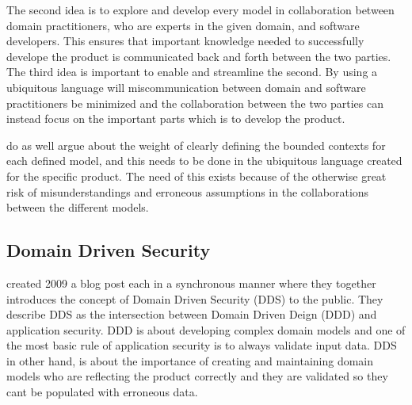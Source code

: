 The second idea is to explore and develop every model in collaboration between domain practitioners, who are experts in the given domain, and software developers. This ensures that important knowledge needed to successfully develope the product is communicated back and forth between the two parties. \parencite{millett_2015} The third idea is important to enable and streamline the second. By using a ubiquitous language will miscommunication between domain and software practitioners be minimized and the collaboration between the two parties can instead focus on the important parts which is to develop the product. \parencite{evans_2015}

\textcite{evans_2015} do as well argue about the weight of clearly defining the bounded contexts for each defined model, and this needs to be done in the ubiquitous language created for the specific product. The need of this exists because of the otherwise great risk of misunderstandings and erroneous assumptions in the collaborations between the different models. \parencite{millett_2015}


\subsection{Domain Driven Security}
\textcite{Wilander2009, Johnsson2009} created 2009 a blog post each in a synchronous manner where they together introduces the concept of Domain Driven Security (DDS) to the public. They describe DDS as the intersection between Domain Driven Deign (DDD) and application security. DDD is about developing complex domain models and one of the most basic rule of application security is to always validate input data. DDS in other hand, is about the importance of creating and maintaining domain models who are reflecting the product correctly and they are validated so they cant be populated with erroneous data. \parencite{Wilander2009, Johnsson2009, Arnor2016, Stendahl2016}